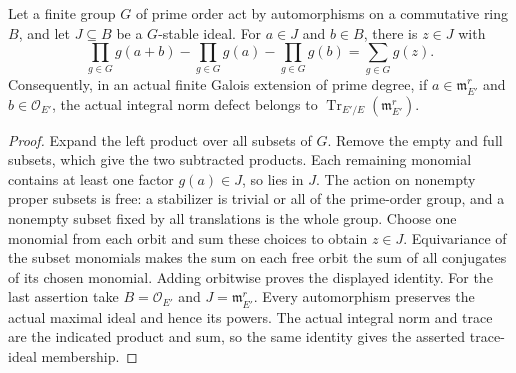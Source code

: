 \begin{lemma}
\label{fw:norm-defect-controlled-trace}
\leanok
Let a finite group $G$ of prime order act by automorphisms on a
commutative ring $B$, and let $J\subseteq B$ be a $G$-stable ideal.
For $a\in J$ and $b\in B$, there is $z\in J$ with
\[
 \prod_{g\in G}g(a+b)-\prod_{g\in G}g(a)-\prod_{g\in G}g(b)
       =\sum_{g\in G}g(z).
\]
Consequently, in an actual finite Galois extension of prime degree,
if $a\in\mathfrak m_{E'}^r$ and $b\in\mathcal O_{E'}$, the
actual integral norm defect belongs to
$\operatorname{Tr}_{E'/E}(\mathfrak m_{E'}^r)$.
\end{lemma}
\begin{proof}
Expand the left product over all subsets of $G$. Remove the empty
and full subsets, which give the two subtracted products. Each
remaining monomial contains at least one factor $g(a)\in J$,
so lies in $J$. The action on nonempty proper subsets is free:
a stabilizer is trivial or all of the prime-order group, and a
nonempty subset fixed by all translations is the whole group.
Choose one monomial from each orbit and sum these choices to
obtain $z\in J$. Equivariance of the subset monomials makes the
sum on each free orbit the sum of all conjugates of its chosen
monomial. Adding orbitwise proves the displayed identity.
For the last assertion take $B=\mathcal O_{E'}$ and
$J=\mathfrak m_{E'}^r$. Every automorphism preserves the
actual maximal ideal and hence its powers. The actual integral
norm and trace are the indicated product and sum, so the same
identity gives the asserted trace-ideal membership.
\end{proof}

